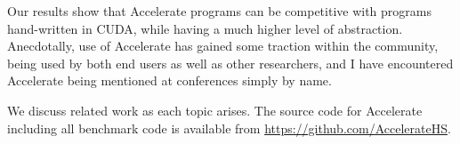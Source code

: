 Our results show that Accelerate programs can be competitive with programs
hand-written in CUDA, while having a much higher level of abstraction.
Anecdotally, use of Accelerate has gained some traction within the community,
being used by both end users as well as other researchers, and I have
encountered Accelerate being mentioned at conferences simply by name.

We discuss related work as each topic arises. The source code for Accelerate
including all benchmark code is available from
\url{https://github.com/AccelerateHS}.


%

